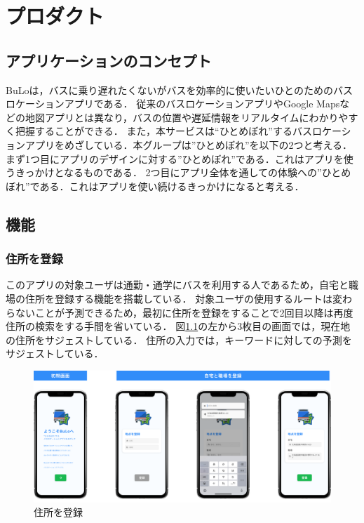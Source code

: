 \chapter{プロダクト}

\section{アプリケーションのコンセプト}
BuLoは，バスに乗り遅れたくないがバスを効率的に使いたいひとのためのバスロケーションアプリである．
従来のバスロケーションアプリやGoogle Mapsなどの地図アプリとは異なり，バスの位置や遅延情報をリアルタイムにわかりやすく把握することができる．
また，本サービスは“ひとめぼれ”するバスロケーションアプリをめざしている．本グループは”ひとめぼれ”を以下の2つと考える．
まず1つ目にアプリのデザインに対する”ひとめぼれ”である．これはアプリを使うきっかけとなるものである．
2つ目にアプリ全体を通しての体験への”ひとめぼれ”である．これはアプリを使い続けるきっかけになると考える．

\section{機能}
\subsection{住所を登録}
    このアプリの対象ユーザは通勤・通学にバスを利用する人であるため，自宅と職場の住所を登録する機能を搭載している．
    対象ユーザの使用するルートは変わらないことが予測できるため，最初に住所を登録をすることで2回目以降は再度住所の検索をする手間を省いている．
    図\ref{fig:feature_register}の左から3枚目の画面では，現在地の住所をサジェストしている．
    住所の入力では，キーワードに対しての予測をサジェストしている．
    \pagebreak
    \begin{figure}
        \centering
        \includegraphics[width=14cm]{images/feature_register.png}
        \caption{住所を登録}
        \label{fig:feature_register}
    \end{figure}
